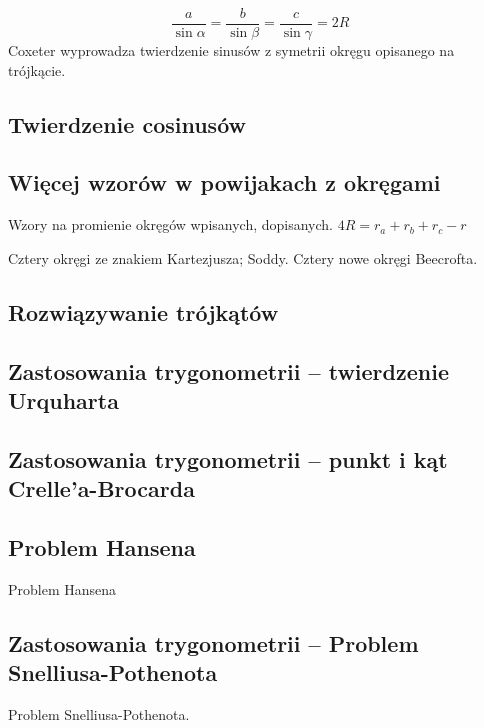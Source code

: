 $$\frac{a}{\sin \alpha} = \frac{b}{\sin \beta} = \frac{c}{\sin \gamma} = 2R$$
Coxeter \cite[s. 28, 29]{coxeter_1967} wyprowadza twierdzenie sinusów z symetrii okręgu opisanego na trójkącie.

\subsection{Twierdzenie cosinusów}
%

%

\subsection{Więcej wzorów w powijakach z okręgami}
Wzory na promienie okręgów wpisanych, dopisanych.
$4R = r_a + r_b + r_c - r$ %

Cztery okręgi ze znakiem Kartezjusza; Soddy.
Cztery nowe okręgi Beecrofta.
%

\subsection{Rozwiązywanie trójkątów}


\subsection{Zastosowania trygonometrii -- twierdzenie Urquharta}


\subsection{Zastosowania trygonometrii -- punkt i kąt Crelle'a-Brocarda}


\subsection{Problem Hansena}
Problem Hansena
%

\subsection{Zastosowania trygonometrii -- Problem Snelliusa-Pothenota}
Problem Snelliusa-Pothenota.
%

